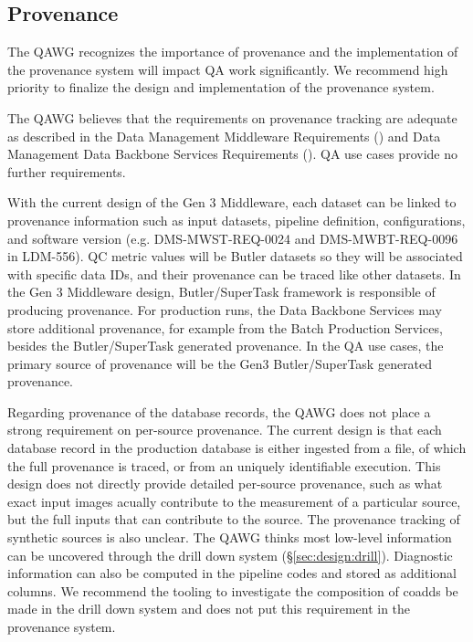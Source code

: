 \subsection{Provenance}
\label{sec:comp:provenance}


The QAWG recognizes the importance of provenance and the
implementation of the provenance system will impact QA work
significantly.  We recommend high priority to finalize the design
and implementation of the provenance system.

The QAWG believes that the requirements on provenance tracking are
adequate as described in the Data Management Middleware Requirements
() and Data Management Data Backbone Services
Requirements (). QA use cases provide no further
requirements.

With the current design of the Gen 3 Middleware, each dataset
can be linked to provenance information such as input datasets,
pipeline definition, configurations, and software version
(e.g. DMS-MWST-REQ-0024 and DMS-MWBT-REQ-0096 in LDM-556).
QC metric values will be Butler datasets so they will be associated
with specific data IDs, and their provenance can be traced like
other datasets. In the Gen 3 Middleware design, Butler/SuperTask
framework is responsible of producing provenance.  For production
runs, the Data Backbone Services may store additional provenance,
for example from the Batch Production Services, besides the
Butler/SuperTask generated provenance.  In the QA use cases, the
primary source of provenance will be the Gen3 Butler/SuperTask
generated provenance.

Regarding provenance of the database records, the QAWG does not
place a strong requirement on per-source provenance.  The current
design is that each database record in the production database is
either ingested from a file, of which the full provenance is traced,
or from an uniquely identifiable execution.  This design does not
directly provide detailed per-source provenance, such as what exact
input images acually contribute to the measurement of a particular
source, but the full inputs that can contribute to the source.  The
provenance tracking of synthetic sources is also unclear.  The QAWG
thinks most low-level information can be uncovered through the drill
down system (\S\ref{sec:design:drill}).  Diagnostic information can
also be computed in the pipeline codes and stored as additional
columns.  We recommend the tooling to investigate the composition
of coadds be made in the drill down system and does not put this
requirement in the provenance system.

